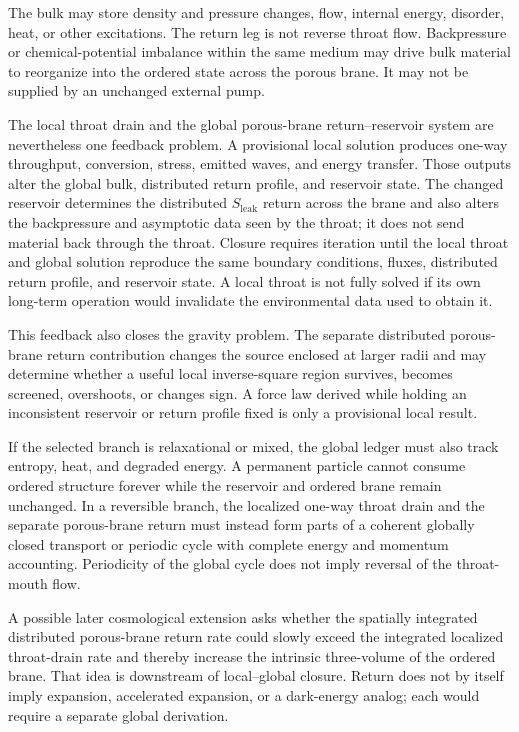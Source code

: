 The bulk may store density and pressure changes, flow, internal energy, disorder,
heat, or other excitations. The return leg is not reverse throat flow.
Backpressure or chemical-potential imbalance within the same medium may drive
bulk material to reorganize into the ordered state across the porous brane. It
may not be supplied by an unchanged external pump.

The local throat drain and the global porous-brane return--reservoir system are
nevertheless one feedback problem. A provisional local solution produces
one-way throughput, conversion, stress, emitted waves, and energy transfer.
Those outputs alter the global bulk, distributed return profile, and reservoir
state. The changed reservoir determines the distributed \(S_{\mathrm{leak}}\)
return across the brane and also alters the backpressure and asymptotic data seen
by the throat; it does not send material back through the throat. Closure
requires iteration until the local throat and global solution reproduce the same
boundary conditions, fluxes, distributed return profile, and reservoir state. A
local throat is not fully solved if its own long-term operation would invalidate
the environmental data used to obtain it.

This feedback also closes the gravity problem. The separate distributed
porous-brane return contribution changes the source enclosed at larger radii and
may determine whether a useful local inverse-square region survives, becomes
screened, overshoots, or changes sign. A force law derived while holding an
inconsistent reservoir or return profile fixed is only a provisional local
result.

If the selected branch is relaxational or mixed, the global ledger must also
track entropy, heat, and degraded energy. A permanent particle cannot consume
ordered structure forever while the reservoir and ordered brane remain
unchanged. In a reversible branch, the localized one-way throat drain and the
separate porous-brane return must instead form parts of a coherent globally
closed transport or periodic cycle with complete energy and momentum accounting.
Periodicity of the global cycle does not imply reversal of the throat-mouth flow.

A possible later cosmological extension asks whether the spatially integrated
distributed porous-brane return rate could slowly exceed the integrated
localized throat-drain rate and thereby increase the intrinsic three-volume of
the ordered brane. That idea is downstream of local--global closure. Return does
not by itself imply expansion, accelerated expansion, or a dark-energy analog;
each would require a separate global derivation.

